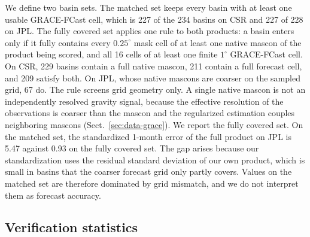 \documentclass[hess, manuscript]{copernicus}
\begin{document}
We define two basin sets. The matched set keeps every basin with at least
one usable GRACE-FCast cell, which is 227 of the 234 basins on CSR and 227
of 228 on JPL.
The fully covered set applies one rule to both products: a basin enters
only if it fully contains every $0.25^{\circ}$ mask cell of at least one
native mascon of the product being scored, and all 16 cells of at
least one finite $1^{\circ}$ GRACE-FCast cell. On CSR, 229 basins
contain a full native mascon, 211 contain a full forecast cell, and 209 satisfy both. On JPL, whose native mascons are coarser on the sampled grid,
67 do. The rule screens grid geometry only. A single native mascon is not
an independently resolved gravity signal, because the effective resolution
of the observations is coarser than the mascon and the regularized
estimation couples neighboring mascons (Sect.~\ref{sec:data-grace}).
We report the fully covered set. On the matched set, the standardized
1-month error of the full product on JPL is
5.47 against 0.93 on the fully covered set. The gap arises because our
standardization uses the residual standard deviation of our own product,
which is small in basins that the coarser forecast grid only partly
covers. Values on the matched set are therefore dominated by grid mismatch, and we do not interpret them as forecast accuracy.

\subsection{Verification statistics}
\label{sec:methods-stats}
\end{document}
